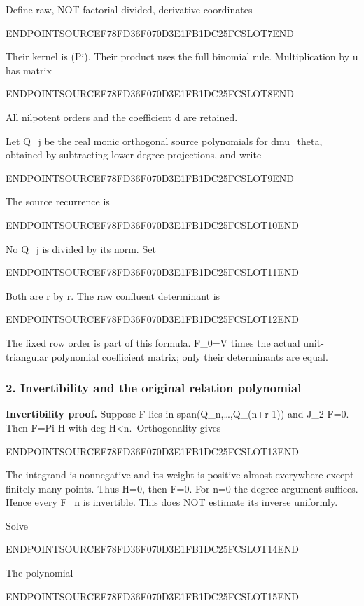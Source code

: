 Define raw, NOT factorial-divided, derivative coordinates

ENDPOINTSOURCEF78FD36F070D3E1FB1DC25FCSLOT7END

Their kernel is (Pi). Their product uses the full binomial rule. Multiplication by u has matrix

ENDPOINTSOURCEF78FD36F070D3E1FB1DC25FCSLOT8END

All nilpotent orders and the coefficient d are retained.

Let Q\_j be the real monic orthogonal source polynomials for dmu\_theta, obtained by subtracting lower-degree projections, and write

ENDPOINTSOURCEF78FD36F070D3E1FB1DC25FCSLOT9END

The source recurrence is

ENDPOINTSOURCEF78FD36F070D3E1FB1DC25FCSLOT10END

No Q\_j is divided by its norm. Set

ENDPOINTSOURCEF78FD36F070D3E1FB1DC25FCSLOT11END

Both are r by r. The raw confluent determinant is

ENDPOINTSOURCEF78FD36F070D3E1FB1DC25FCSLOT12END

The fixed row order is part of this formula. F\_0=V times the actual unit-triangular polynomial coefficient matrix; only their determinants are equal.

\subsubsection{2. Invertibility and the original relation polynomial}\label{endpoint-pr24_current_corrected--invertibility-and-the-original-relation-polynomial}

\textbf{Invertibility proof.} Suppose F lies in span(Q\_n,\ldots,Q\_(n+r-1)) and J\_2 F=0. Then F=Pi H with deg H\textless n.~Orthogonality gives

ENDPOINTSOURCEF78FD36F070D3E1FB1DC25FCSLOT13END

The integrand is nonnegative and its weight is positive almost everywhere except finitely many points. Thus H=0, then F=0. For n=0 the degree argument suffices. Hence every F\_n is invertible. This does NOT estimate its inverse uniformly.

Solve

ENDPOINTSOURCEF78FD36F070D3E1FB1DC25FCSLOT14END

The polynomial

ENDPOINTSOURCEF78FD36F070D3E1FB1DC25FCSLOT15END

